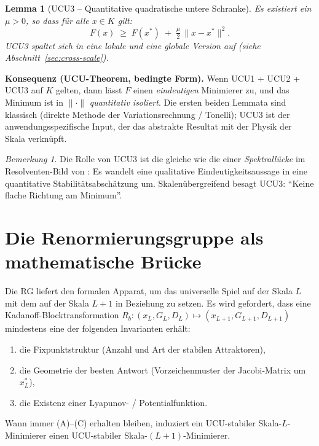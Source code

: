 \documentclass[11pt,a4paper]{article}
\newtheorem{lemma}{Lemma}
\theoremstyle{remark}
\newtheorem*{remark}{Bemerkung}
\begin{document}
\begin{lemma}[UCU3 -- Quantitative quadratische untere Schranke]
\label{lem:ucu3}
Es existiert ein $\mu > 0$, so dass für alle $x \in K$ gilt:
\[
F(x) \;\ge\; F(x^*) \;+\; \tfrac{\mu}{2}\,\|x - x^*\|^2.
\]
UCU3 spaltet sich in eine \emph{lokale} und eine \emph{globale} Version auf (siehe Abschnitt~\ref{sec:cross-scale}).
\end{lemma}

\noindent\textbf{Konsequenz (UCU-Theorem, bedingte Form).}
Wenn UCU1 + UCU2 + UCU3 auf $K$ gelten, dann lässt $F$ einen \emph{eindeutigen} Minimierer zu, und das Minimum ist in $\|\cdot\|$ \emph{quantitativ isoliert}. Die ersten beiden Lemmata sind klassisch (direkte Methode der Variationsrechnung / Tonelli); UCU3 ist der anwendungsspezifische Input, der das abstrakte Resultat mit der Physik der Skala verknüpft.

\begin{remark}
Die Rolle von UCU3 ist die gleiche wie die einer \emph{Spektrallücke} im Resolventen-Bild von \cite{GeigerZookeeper-2026}: Es wandelt eine qualitative Eindeutigkeitsaussage in eine quantitative Stabilitätsabschätzung um. Skalenübergreifend besagt UCU3: ``Keine flache Richtung am Minimum''.
\end{remark}

\section{Die Renormierungsgruppe als mathematische Brücke}
\label{sec:rg-bridge}

Die RG liefert den formalen Apparat, um das universelle Spiel auf der Skala $L$ mit dem auf der Skala $L+1$ in Beziehung zu setzen. Es wird gefordert, dass eine Kadanoff-Blocktransformation $R_b : (x_L, G_L, D_L) \mapsto (x_{L+1}, G_{L+1}, D_{L+1})$ mindestens eine der folgenden Invarianten erhält:
\begin{enumerate}[label=(\Alph*),leftmargin=2em]
\item die Fixpunktstruktur (Anzahl und Art der stabilen Attraktoren),
\item die Geometrie der besten Antwort (Vorzeichenmuster der Jacobi-Matrix um $x_L^*$),
\item die Existenz einer Lyapunov- / Potentialfunktion.
\end{enumerate}
Wann immer (A)--(C) erhalten bleiben, induziert ein UCU-stabiler Skala-$L$-Minimierer einen UCU-stabiler Skala-$(L{+}1)$-Minimierer.
\end{document}
